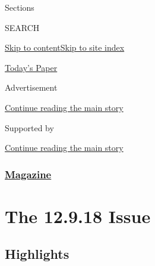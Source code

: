 Sections

SEARCH

\protect\hyperlink{site-content}{Skip to
content}\protect\hyperlink{site-index}{Skip to site index}

\href{https://myaccount.nytimes3xbfgragh.onion/auth/login?response_type=cookie\&client_id=vi}{}

\href{https://www.nytimes3xbfgragh.onion/section/todayspaper}{Today's
Paper}

Advertisement

\protect\hyperlink{after-top}{Continue reading the main story}

Supported by

\protect\hyperlink{after-sponsor}{Continue reading the main story}

\hypertarget{magazine}{%
\subsubsection{\texorpdfstring{\href{/section/magazine}{Magazine}}{Magazine}}\label{magazine}}

\hypertarget{the-12918-issue}{%
\section{The 12.9.18 Issue}\label{the-12918-issue}}

\hypertarget{highlights}{%
\subsection{Highlights}\label{highlights}}

